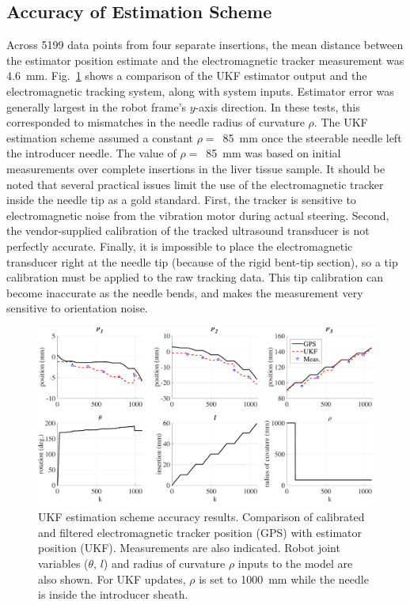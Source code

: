\subsection{Accuracy of Estimation Scheme}
Across 5199 data points from four separate insertions, the mean distance between the estimator position estimate and the electromagnetic tracker measurement was 4.6~mm. Fig.~\ref{fig:UKFAccuracy} shows a comparison of the UKF estimator output and the electromagnetic tracking system, along with system inputs. Estimator error was generally largest in the robot frame's $y$-axis direction. In these tests, this corresponded to mismatches in the needle radius of curvature $\rho$. The UKF estimation scheme assumed a constant $\rho =$~85~mm once the steerable needle left the introducer needle. The value of $\rho = $~85~mm was based on initial measurements over complete insertions in the liver tissue sample. It should be noted that several practical issues limit the use of the electromagnetic tracker inside the needle tip as a gold standard. First, the tracker is sensitive to electromagnetic noise from the vibration motor during actual steering. Second, the vendor-supplied calibration of the tracked ultrasound transducer is not perfectly accurate. Finally, it is impossible to place the electromagnetic transducer right at the needle tip (because of the rigid bent-tip section), so a tip calibration must be applied to the raw tracking data. This tip calibration can become inaccurate as the needle bends, and makes the measurement very sensitive to orientation noise. 

\begin{figure}[!t]
\centering
\includegraphics[width = \columnwidth]{./Images/Chapter5/UKFAccuracy/UKFAccuracy.pdf}%
\caption[UKF accuracy results]{UKF estimation scheme accuracy results. Comparison of calibrated and filtered electromagnetic tracker position (GPS) with estimator position (UKF). Measurements are also indicated. Robot joint variables ($\theta$, $l$) and radius of curvature $\rho$ inputs to the model are also shown. For UKF updates, $\rho$ is set to 1000~mm while the needle is inside the introducer sheath. }
\label{fig:UKFAccuracy}
\end{figure}  

